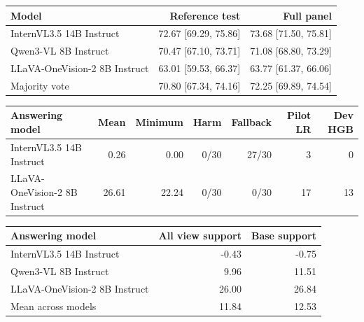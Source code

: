 \begin{tabular}{lrr}
\hline
Model & Reference test & Full panel \\
\hline
InternVL3.5 14B Instruct & 72.67 [69.29, 75.86] & 73.68 [71.50, 75.81] \\
Qwen3-VL 8B Instruct & 70.47 [67.10, 73.71] & 71.08 [68.80, 73.29] \\
LLaVA-OneVision-2 8B Instruct & 63.01 [59.53, 66.37] & 63.77 [61.37, 66.06] \\
Majority vote & 70.80 [67.34, 74.16] & 72.25 [69.89, 74.54] \\
\hline
\end{tabular}

\begin{tabular}{lrrrrrr}
\hline
Answering model & Mean & Minimum & Harm & Fallback & Pilot LR & Dev HGB \\
\hline
InternVL3.5 14B Instruct & 0.26 & 0.00 & 0/30 & 27/30 & 3 & 0 \\
LLaVA-OneVision-2 8B Instruct & 26.61 & 22.24 & 0/30 & 0/30 & 17 & 13 \\
\hline
\end{tabular}

\begin{tabular}{lrr}
\hline
Answering model & All view support & Base support \\
\hline
InternVL3.5 14B Instruct & -0.43 & -0.75 \\
Qwen3-VL 8B Instruct & 9.96 & 11.51 \\
LLaVA-OneVision-2 8B Instruct & 26.00 & 26.84 \\
Mean across models & 11.84 & 12.53 \\
\hline
\end{tabular}
